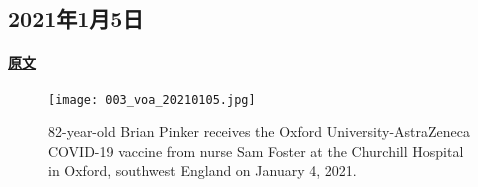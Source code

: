 \subsection{2021年1月5日}
\paragraph{\href{https://www.51voa.com/VOA_Special_English/us-considers-vaccinating-more-people-using-half-doses-86059.html}{原文}}

\begin{figure}[H]
\centering
\texttt{[image: 003\_voa\_20210105.jpg]}
\caption{82-year-old Brian Pinker receives the Oxford University-AstraZeneca COVID-19 vaccine from nurse Sam Foster at the Churchill Hospital in Oxford, southwest England on January 4, 2021.}
\end{figure}

